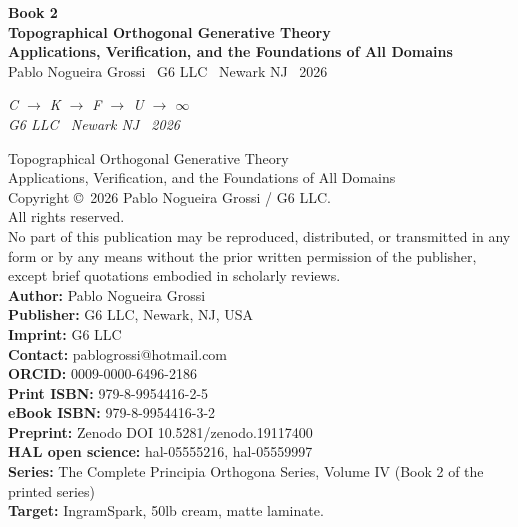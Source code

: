 \thispagestyle{empty}
\begin{center}
  \vspace*{1.5cm}

  {\LARGE\bfseries Book 2}\\[1em]
  {\LARGE\bfseries Topographical Orthogonal Generative Theory}\\[2em]
  {\LARGE\bfseries Applications, Verification, \break
  and the Foundations of All Domains}\\[2em]
  {\Large Pablo Nogueira Grossi \textperiodcentered\ G6 LLC
         \textperiodcentered\ Newark NJ \textperiodcentered\ 2026}
\end{center}
\vspace{1.5cm}
\begin{center}
\itshape
C \;$\to$\; K \;$\to$\; F \;$\to$\; U \;$\to$\; $\infty$\\[0.3em]
\normalfont\small G6 LLC \textperiodcentered\ Newark NJ
\textperiodcentered\ 2026
\end{center}
\cleardoublepage

\thispagestyle{empty}
\vspace*{\fill}
\noindent
Topographical Orthogonal Generative Theory\\
Applications, Verification, and the Foundations of All Domains\\[1em]
Copyright \copyright\ 2026 Pablo Nogueira Grossi / G6 LLC.\\
All rights reserved.\\[1em]
No part of this publication may be reproduced, distributed,
or transmitted in any form or by any means without the prior
written permission of the publisher, except brief quotations
embodied in scholarly reviews.\\[1em]
\textbf{Author:} Pablo Nogueira Grossi\\
\textbf{Publisher:} G6 LLC, Newark, NJ, USA\\
\textbf{Imprint:} G6 LLC\\
\textbf{Contact:} pablogrossi@hotmail.com\\
\textbf{ORCID:} 0009-0000-6496-2186\\[1em]
\textbf{Print ISBN:} 979-8-9954416-2-5\\
\textbf{eBook ISBN:} 979-8-9954416-3-2\\[1em]
\textbf{Preprint:} Zenodo DOI 10.5281/zenodo.19117400\\
\textbf{HAL open science:} hal-05555216, hal-05559997\\[1em]
\textbf{Series:} The Complete Principia Orthogona Series, Volume IV
(Book 2 of the printed series)\\[1em]
\textbf{Target:} IngramSpark, 50lb cream, matte laminate.
\vspace*{\fill}
\cleardoublepage

